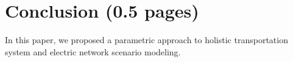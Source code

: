 \section{Conclusion (0.5 pages)}
\label{section:conclusion}

In this paper, we proposed a parametric approach to holistic transportation system and electric network scenario modeling.

